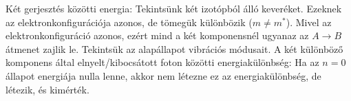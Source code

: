    Két gerjesztés közötti energia:
   Tekintsünk két izotópból álló keveréket. Ezeknek az elektronkonfigurációja azonos, de tömegük különbözik ($m\ne m^*$). Mivel az elektronkonfiguráció azonos, ezért  mind a két komponensnél ugyanaz az $A\to B$ átmenet zajlik le. Tekintsük az alapállapot vibrációs módusait. A két különböző komponens által elnyelt/kibocsátott foton közötti energiakülönbség:
   Ha az $n=0$ állapot energiája nulla lenne, akkor nem létezne ez az energiakülönbség, de létezik, és kimérték.
   
   
   
   
   
   
   
   
   
   
   
   
   
